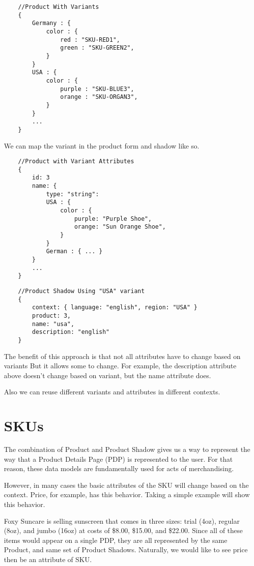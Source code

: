 \documentclass[11pt]{article}
\begin{document}
\begin{lstlisting}
    //Product With Variants
    {
        Germany : {
            color : {
                red : "SKU-RED1",
                green : "SKU-GREEN2",
            }
        }
        USA : {
            color : {
                purple : "SKU-BLUE3",
                orange : "SKU-ORGAN3",
            }
        }
        ...
    }
\end{lstlisting}
We can map the variant in the product form and shadow like so.

\begin{lstlisting}
    //Product with Variant Attributes
    {
        id: 3
        name: { 
            type: "string": 
            USA : {  
                color : {
                    purple: "Purple Shoe", 
                    orange: "Sun Orange Shoe", 
                }
            }
            German : { ... }
        }
        ...
    }
\end{lstlisting}

\begin{lstlisting}
    //Product Shadow Using "USA" variant
    {
        context: { language: "english", region: "USA" }
        product: 3,
        name: "usa",
        description: "english"
    }
\end{lstlisting}

The benefit of this approach is that not all attributes have to change based on variants
But it allows some to change. For example, the description attribute above doesn't
change based on variant, but the name attribute does.

Also we can reuse different variants and attributes in different contexts.

\newpage
\section{SKUs}

The combination of Product and Product Shadow gives us a way to represent the way that a
Product Details Page (PDP) is represented to the user. For that reason, these data models
are fundamentally used for acts of merchandising.

However, in many cases the basic attributes of the SKU will change based on the context.
Price, for example, has this behavior. Taking a simple example will show this behavior.

Foxy Suncare is selling sunscreen that comes in three sizes: trial (4oz), regular (8oz),
and jumbo (16oz) at costs of \$8.00, \$15.00, and \$22.00. Since all of these items would
appear on a single PDP, they are all represented by the same Product, and same set of
Product Shadows. Naturally, we would like to see price then be an attribute of SKU.
\end{document}
